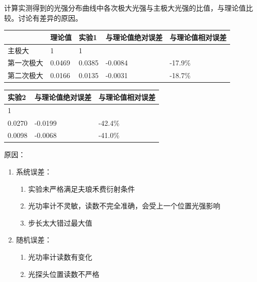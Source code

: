 \documentclass[dvipsnames, svgnames,a4paper,11pt]{article}
\begin{document}
\begin{question}
	计算实测得到的光强分布曲线中各次极大光强与主极大光强的比值，与理论值比较。讨论有差异的原因。
	\tcblower
	\begin{table}[H]
		\centering
		\begin{tabular}{|l|l|l|l|l|}
		\hline
		&理论值&实验1&与理论值绝对误差&与理论值相对误差\\ \hline
		主极大&1&1&&\\
		\hline
		第一次极大&0.0469&0.0385&-0.0084&-17.9\%\\
		\hline
		第二次极大&0.0166&0.0135&-0.0031&-18.7\%\\
		\hline
		\end{tabular}
		\begin{tabular}{|l|l|l|}
			\hline
			实验2&与理论值绝对误差&与理论值相对误差\\ \hline
			1&&\\
			\hline
			0.0270&-0.0199&-42.4\%\\
			\hline
			0.0098&-0.0068&-41.0\%\\
			\hline
		\end{tabular}
	\end{table}
	原因：\begin{enumerate}
		\item 系统误差：\begin{enumerate}
			\item 实验未严格满足夫琅禾费衍射条件
			\item 光功率计不灵敏，读数不完全准确，会受上一个位置光强影响
			\item 步长太大错过最大值
		\end{enumerate}
		\item 随机误差：\begin{enumerate}
			\item 光功率计读数有变化
			\item 光探头位置读数不严格
		\end{enumerate}
	\end{enumerate}
\end{question}
\end{document}
